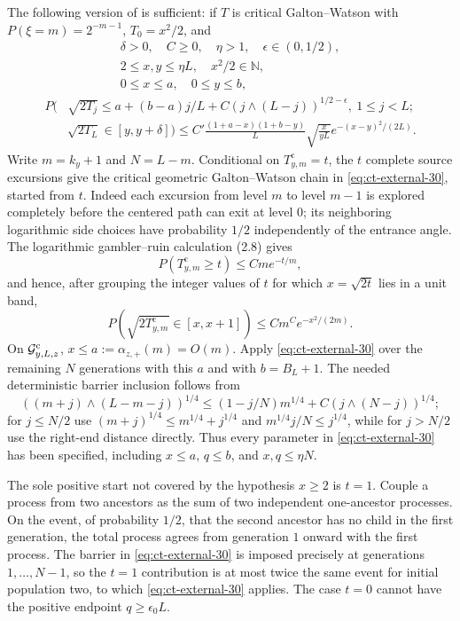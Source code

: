 The following version of \cite[Appendix, Theorem~9.1(a)]{Rosen2022}
is sufficient: if $T$ is critical Galton--Watson with
$P(\xi=m)=2^{-m-1}$, $T_0=x^2/2$, and
\[
\begin{gathered}
\delta>0,\quad C\ge0,\quad\eta>1,\quad\epsilon\in(0,1/2),\\
2\le x,y\le\eta L,\quad x^2/2\in\mathbb N,\\
0\le x\le a,\quad0\le y\le b,
\end{gathered}
\]
\begin{equation}
\begin{split}
P\big(&\sqrt{2T_j}\le a+(b-a)j/L
             +C(j\wedge(L-j))^{1/2-\epsilon},\ 1\le j<L;\\
&\sqrt{2T_L}\in[y,y+\delta]\big)
\le C'\frac{(1+a-x)(1+b-y)}L\sqrt{\frac{x}{yL}}
e^{-(x-y)^2/(2L)}.\label{eq:ct-external-30}
\end{split}
\end{equation}
Write $m=k_y+1$ and $N=L-m$.  Conditional on $T^{\mathrm c}_{y,m}=t$,
the $t$ complete source excursions give the critical geometric
Galton--Watson chain in \eqref{eq:ct-external-30}, started from $t$.
Indeed each excursion from level $m$ to level $m-1$ is explored completely
before the centered path can exit at level $0$; its neighboring logarithmic
side choices have probability $1/2$ independently of the entrance angle.
The logarithmic
gambler--ruin calculation (2.8) gives
\[
P(T^{\mathrm c}_{y,m}\ge t)\le Cm e^{-t/m},
\]
and hence, after grouping the integer values of $t$ for which
$x=\sqrt{2t}$ lies in a unit band,
\begin{equation}
P(\sqrt{2T^{\mathrm c}_{y,m}}\in[x,x+1])
       \le Cm^C e^{-x^2/(2m)}.\label{eq:ct-external-30a}
\end{equation}
On ${\cal G}^{\mathrm c}_{y,L,z}$, $x\le a:=\alpha_{z,+}(m)=O(m)$.
Apply \eqref{eq:ct-external-30} over the remaining $N$ generations with this $a$ and
with $b=B_L+1$.  The needed deterministic barrier inclusion follows
from
\begin{equation}
((m+j)\wedge(L-m-j))^{1/4}
 \le (1-j/N)m^{1/4}+C(j\wedge(N-j))^{1/4};\label{eq:ct-external-30b}
\end{equation}
for $j\le N/2$ use
$(m+j)^{1/4}\le m^{1/4}+j^{1/4}$ and
$m^{1/4}j/N\le j^{1/4}$, while for $j>N/2$ use the
right-end distance directly.  Thus every parameter in \eqref{eq:ct-external-30} has been
specified, including $x\le a$, $q\le b$, and
$x,q\le\eta N$.

The sole positive start not covered by the hypothesis $x\ge2$ is
$t=1$.  Couple a process from two ancestors as the sum of two
independent one-ancestor processes.  On the event, of probability
$1/2$, that the second ancestor has no child in the first generation,
the total process agrees from generation $1$ onward with the first
process.  The barrier in \eqref{eq:ct-external-30} is imposed precisely at generations
$1,\ldots,N-1$, so the $t=1$ contribution is at most twice the same
event for initial population two, to which \eqref{eq:ct-external-30} applies.  The case
$t=0$ cannot have the positive endpoint $q\ge\epsilon_0L$.

